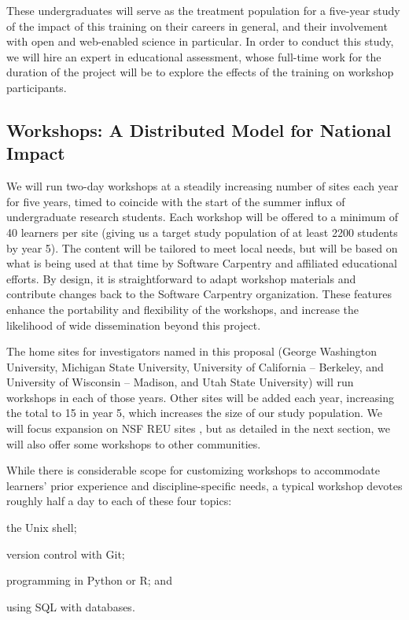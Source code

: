 \documentclass{proposalnsf}
\begin{document}
These undergraduates will serve as the treatment population for a
five-year study of the impact of this training on their careers in
general, and their involvement with open and web-enabled science in
particular.  In order to conduct this study, we will hire an expert in
educational assessment, whose full-time work for the duration of the
project will be to explore the effects of the training on workshop
participants.

\subsection{Workshops: A Distributed Model for National Impact}

We will run two-day workshops at a steadily increasing number of sites
each year for five years, timed to coincide with the start of the
summer influx of undergraduate research students.  Each workshop will
be offered to a minimum of 40 learners per site (giving us a target
study population of at least 2200 students by year 5).  The content will be
tailored to meet local needs, but will be based on what is being used
at that time by Software Carpentry and affiliated educational efforts.
By design, it is straightforward to adapt workshop materials and
contribute changes back to the Software Carpentry organization.  These
features enhance the portability and flexibility of the workshops, and
increase the likelihood of wide dissemination beyond this project.

The home sites for investigators named in this proposal (George
Washington University, Michigan State University, University of
California -- Berkeley, and University of Wisconsin -- Madison, and
Utah State University) will run workshops in each of those years.
Other sites will be added each year, increasing the total to 15 in
year 5, which increases the size of our study population.  We will
focus expansion on NSF REU sites \cite{nsfreu}, but as detailed in the
next section, we will also offer some workshops to other communities.

While there is considerable scope for customizing
workshops to accommodate learners' prior experience and
discipline-specific needs, a typical workshop devotes roughly half a
day to each of these four topics:

\begin{compactitem}
\item
  the Unix shell;
\item
  version control with Git;
\item
  programming in Python or R; and
\item
  using SQL with databases.
\end{compactitem}
\end{document}
